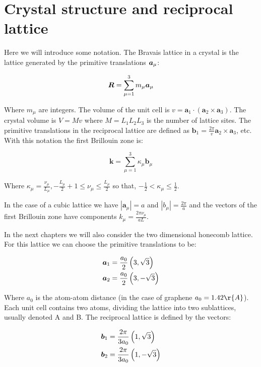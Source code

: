 \chapter{Crystal structure and reciprocal lattice}
\label{AP1A}

Here we will introduce some notation. The Bravais lattice in a crystal is the lattice generated by the primitive translations $\boldsymbol{a}_\mu$:

\begin{equation}
\boldsymbol{R} = \sum_{\mu=1}^3 m_\mu \boldsymbol{a}_\mu
\end{equation}

Where $m_\mu$ are integers. The volume of the unit cell is $v = \textbf{a}_1 \cdot (\textbf{a}_2 \times \textbf{a}_3)$. The crystal volume is $V = Mv$ where $M = L_1 L_2 L_3$ is the number of lattice sites. The primitive translations in the reciprocal lattice are defined as $\textbf{b}_1 = \frac{2 \pi}{v}\textbf{a}_2 \times \textbf{a}_3$, etc. With this notation the first Brillouin zone is:

\begin{equation}
\textbf{k} = \sum_{\mu=1}^3 \kappa_\mu \textbf{b}_\mu
\end{equation}

Where $\kappa_\mu = \frac{\nu_\mu}{L_\mu}, -\frac{L_\mu}{2}+1 \leq \nu_\mu \leq \frac{L_\mu}{2}$ so that, $-\frac{1}{2} < \kappa_\mu \leq \frac{1}{2}$. 

In the case of a cubic lattice we have $|\textbf{a}_\mu| = a$ and $|b_\mu| = \frac{2\pi}{a}$ and the vectors of the first Brillouin zone have components $k_\mu = \frac{2 \pi \nu_\mu}{aL}$.

In the next chapters we will also consider the two dimensional honecomb lattice. For this lattice we can choose the primitive translations to be:

\begin{align}
\boldsymbol{a}_1 &= \frac{a_0}{2} \left(3, \sqrt{3} \right) \\
\boldsymbol{a}_2 &= \frac{a_0}{2} \left(3, -\sqrt{3} \right)
\end{align}

Where $a_0$ is the atom-atom distance (in the case of graphene $a_0 = 1.42 \r{A}$). Each unit cell contains two atoms, dividing the lattice into two sublattices, usually denoted A and B. The reciprocal lattice is defined by the vectors:

\begin{align}
\boldsymbol{b}_1 &= \frac{2\pi}{3a_0} \left(1, \sqrt{3} \right) \\
\boldsymbol{b}_2 &= \frac{2\pi}{3a_0} \left(1, -\sqrt{3} \right)
\end{align}

